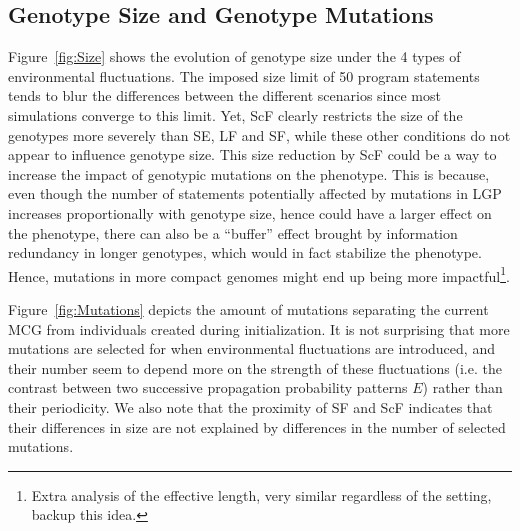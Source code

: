 \subsection{Genotype Size and Genotype Mutations}

Figure~\ref{fig:Size} shows the evolution of genotype size under the 4 types of environmental fluctuations. The imposed size limit of 50 program statements tends to blur the differences between the different scenarios since most simulations converge to this limit. Yet, ScF clearly restricts the size of the genotypes more severely than SE, LF and SF, while these other conditions do not appear to influence genotype size. This size reduction by ScF could be a way to increase the impact of genotypic mutations on the phenotype. This is because, even though the number of statements potentially affected by mutations in LGP increases proportionally with genotype size, hence could have a larger effect on the phenotype, there can also be a ``buffer'' effect brought by information redundancy in longer genotypes, which would in fact stabilize the phenotype. Hence, mutations in more compact genomes might end up being more impactful\footnote{Extra analysis of the effective length, very similar regardless of the setting, backup this idea.}.

Figure~\ref{fig:Mutations} depicts the amount of mutations separating the current MCG from individuals created during initialization. It is not surprising that more mutations are selected for when environmental fluctuations are introduced, and their number seem to depend more on the strength of these fluctuations (i.e. the contrast between two successive propagation probability patterns $E$) rather than their periodicity. We also note that the proximity of SF and ScF indicates that their differences in size are not explained by differences in the number of selected mutations.

